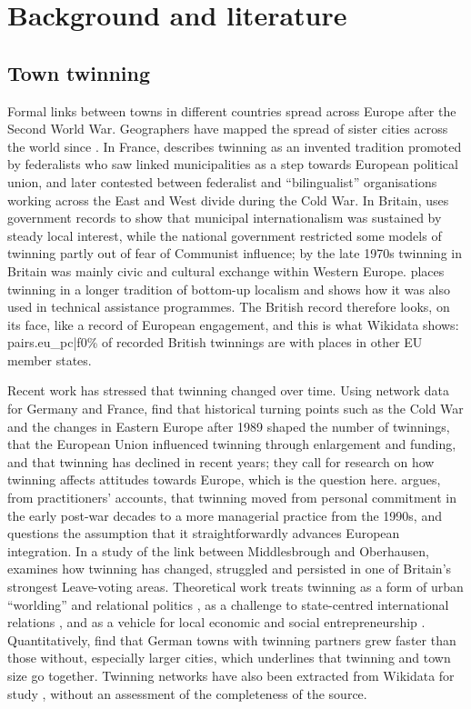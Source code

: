 \documentclass[11pt,a4paper]{article}
\begin{document}
\section{Background and literature}\label{sec:lit}
\subsection{Town twinning}
Formal links between towns in different countries spread across Europe after the Second World War. Geographers have mapped the spread of sister cities across the world since \citet{zelinsky1991}. In France, \citet{vion2002} describes twinning as an invented tradition promoted by federalists who saw linked municipalities as a step towards European political union, and later contested between federalist and ``bilingualist'' organisations working across the East and West divide during the Cold War. In Britain, \citet{clarke2010} uses government records to show that municipal internationalism was sustained by steady local interest, while the national government restricted some models of twinning partly out of fear of Communist influence; by the late 1970s twinning in Britain was mainly civic and cultural exchange within Western Europe. \citet{clarke2009} places twinning in a longer tradition of bottom-up localism and shows how it was also used in technical assistance programmes. The British record therefore looks, on its face, like a record of European engagement, and this is what Wikidata shows: {{pairs.eu_pc|f0}}\% of recorded British twinnings are with places in other EU member states.

Recent work has stressed that twinning changed over time. Using network data for Germany and France, \citet{falkenhain2012} find that historical turning points such as the Cold War and the changes in Eastern Europe after 1989 shaped the number of twinnings, that the European Union influenced twinning through enlargement and funding, and that twinning has declined in recent years; they call for research on how twinning affects attitudes towards Europe, which is the question here. \citet{langenohl2023} argues, from practitioners' accounts, that twinning moved from personal commitment in the early post-war decades to a more managerial practice from the 1990s, and questions the assumption that it straightforwardly advances European integration. In a study of the link between Middlesbrough and Oberhausen, \citet{warwick2024} examines how twinning has changed, struggled and persisted in one of Britain's strongest Leave-voting areas. Theoretical work treats twinning as a form of urban ``worlding'' and relational politics \citep{jayne2011}, as a challenge to state-centred international relations \citep{joenniemi2017}, and as a vehicle for local economic and social entrepreneurship \citep{cremer2001}. Quantitatively, \citet{brakman2016} find that German towns with twinning partners grew faster than those without, especially larger cities, which underlines that twinning and town size go together. Twinning networks have also been extracted from Wikidata for study \citep{seth2018}, without an assessment of the completeness of the source.
\end{document}
